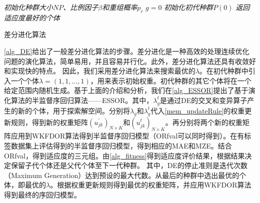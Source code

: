 \IncMargin{1em}
\begin{algorithm}
\emph{初始化种群大小$NP$、比例因子$\beta$和重组概率$p_{r}$}\;
\emph{$g=0$}\;
\emph{初始化初代种群$P(0)$}\;
\emph{返回适应度最好的个体}\;
\caption{差分进化算法}\label{alg_DE}
\end{algorithm}\DecMargin{1em}

\autoref{alg_DE}给出了一般差分进化算法的步骤。差分进化是一种高效的处理连续优化问题的演化算法，简单易用，并且容易并行化\citep{storn1997differential}。此外，差分进化算法还具有收敛好和实现快的特点\citep{price2006differential}。
因此，我们采用差分进化算法来搜索最优的\(\lambda\)。在初代种群中引入一个个体\(\lambda=(1,1,\dots,1)\)，用来表示初始权重。初代种群的其它个体将在一个给定范围内随机生成。基于上面的介绍和分析，我们在\autoref{alg_ESSOR}提出了基于演化算法的半监督序回归算法——ESSOR。其中，\(\lambda_{g}^{t}\)是通过DE的交叉和变异算子产生的新的个体，用于探索解空间。分别将\(\lambda_{g}\)和\(\lambda_g^{t}\)代入\autoref{mem_updateRule}的权重更新规则，得到新的权重矩阵\((u_{jk}^{'})_{N \times K}\)和\((u_{jk}^{t})_{N \times K}\)。再分别将两个新的权重矩阵应用到WKFDOR算法得到半监督序回归模型（ORfval可以同时得到）。在有标签数据集上评估得到的半监督序回归模型，得到相应的MAE和MZE。结合ORfval，得到适应度的三元组。由\autoref{alg_fitness}得到适应度评价结果，根据结果决定保留子代个体还是父代个体至下一代种群。
其中，DE的停止准则是迭代次数（Maximum Generation）达到预设的最大代数。从最后的种群中选出最优的个体，即最优的\(\lambda\)。根据权重更新规则得到最优的权重矩阵，并应用WKFDOR算法得到最终的序回归模型。



